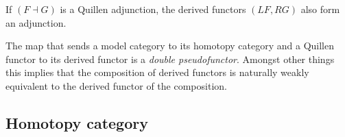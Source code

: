     \begin{property}
        If $(F\dashv G)$ is a Quillen adjunction, the derived functors $(LF,RG)$ also form an adjunction.
    \end{property}

    \begin{property}
        The map that sends a model category to its homotopy category and a Quillen functor to its derived functor is a \textit{double pseudofunctor}. Amongst other things this implies that the composition of derived functors is naturally weakly equivalent to the derived functor of the composition.
    \end{property}

\subsection{Homotopy category}

